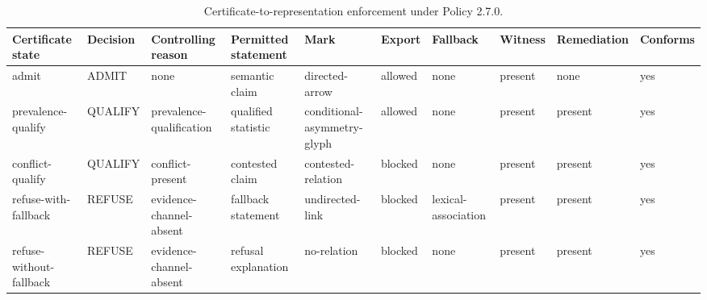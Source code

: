 \begin{table}[t]
  \caption{Certificate-to-representation enforcement under Policy 2.7.0.}
  \label{tab:representation-enforcement}
  \centering
  \scriptsize
  \setlength{\tabcolsep}{1.2pt}
  \begin{tabular}{@{}p{}p{}p{}p{}p{}p{}p{}p{}p{}p{}@{}}
    \toprule
    Certificate state & Decision & Controlling reason & Permitted statement & Mark & Export & Fallback & Witness & Remediation & Conforms \\
    \midrule
    admit & ADMIT & none & semantic claim & directed-arrow & allowed & none & present & none & yes \\
    prevalence-qualify & QUALIFY & prevalence-qualification & qualified statistic & conditional-asymmetry-glyph & allowed & none & present & present & yes \\
    conflict-qualify & QUALIFY & conflict-present & contested claim & contested-relation & blocked & none & present & present & yes \\
    refuse-with-fallback & REFUSE & evidence-channel-absent & fallback statement & undirected-link & blocked & lexical-association & present & present & yes \\
    refuse-without-fallback & REFUSE & evidence-channel-absent & refusal explanation & no-relation & blocked & none & present & present & yes \\
    \bottomrule
  \end{tabular}
\end{table}
